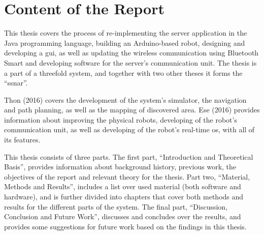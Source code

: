 \newpage
\section{Content of the Report}

This thesis covers the process of re-implementing the server application in the Java programming language, building an Arduino-based robot, designing and developing a \acrfull{gui}, as well as updating the wireless communication using Bluetooth Smart and developing software for the server's communication unit. The thesis is a part of a threefold system, and together with two other theses it forms the ``\acrfull{ssnar}''.

Thon (2016) covers the development of the system's simulator, the navigation and path planning, as well as the mapping of discovered area. Ese (2016) provides information about improving the physical robots, developing of the robot's communication unit, as well as developing of the robot's real-time \acrshort{os}, with all of its features.

This thesis consists of three parts. The first part, ``Introduction and Theoretical Basis'', provides information about background history, previous work, the objectives of the report and relevant theory for the thesis. Part two, ``Material, Methods and Results'', includes a list over used material (both software and hardware), and is further divided into chapters that cover both methods and results for the different parts of the system. The final part, ``Discussion, Conclusion and Future Work'', discusses and concludes over the results, and provides some suggestions for future work based on the findings in this thesis.